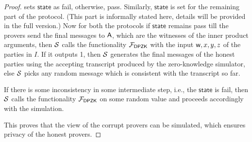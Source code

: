 \begin{proof}
	sets $\mathsf{state}$ as fail, otherwise, pass.
	Similarly, $\mathsf{state}$ is set for the remaining part of the protocol.
	(This part is informally stated here, details will be provided in the full version.)
	Now for both the protocols if $\mathsf{state}$ remains pass till the provers send the final messages to $\mathsf{A}$, which are the witnesses of the inner product arguments, 
	then $\mathcal{S}$ calls the functionality $\mathcal{F}_{\mathsf{DPZK}}$ with the input $\mathsf{w}, x,y,z$ of the parties in $I$. If it outputs 1, then $\mathcal{S}$ generates the final messages of the honest parties using the accepting transcript produced by the zero-knowledge simulator, else $\mathcal{S}$ picks any random message which is consistent with the transcript so far.
	
	If there is some inconsistency in some intermediate step, i.e., the $\mathsf{state}$ is fail, then $\mathcal{S}$ calls the functionality $\mathcal{F}_{\mathsf{DPZK}}$ on some random value and proceeds accordingly with the simulation.
	
	This proves that the view of the corrupt provers can be simulated, which ensures privacy of the honest provers.
\end{proof}

